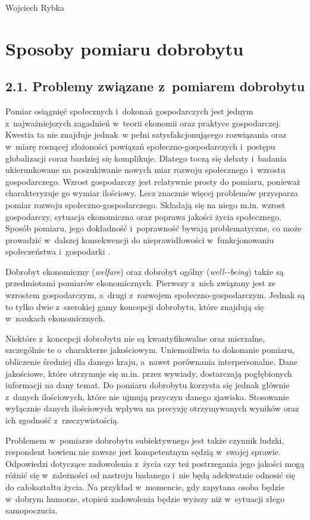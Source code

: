 \begin{artplenv}{Wojciech Rybka}
\section{Sposoby pomiaru dobrobytu}
\baselineskip
\subsection{2.1. Problemy związane z~pomiarem dobrobytu}
Pomiar osiągnięć społecznych i~dokonań gospodarczych jest jednym z~najważniejszych zagadnień w~teorii ekonomii oraz
praktyce gospodarczej. Kwestia ta nie znajduje jednak~w pełni satysfakcjonującego rozwiązania oraz w~miarę rosnącej
złożoności powiązań społeczno-gospodarczych i~postępu globalizacji coraz bardziej się komplikuje. Dlatego toczą się
debaty  i~badania ukierunkowane na poszukiwanie nowych miar rozwoju społecznego i~wzrostu gospodarczego. Wzrost
gospodarczy jest relatywnie prosty do pomiaru, ponieważ charakteryzuje go wymiar ilościowy. Lecz znacznie więcej
problemów przysparza pomiar rozwoju społeczno-gospodarczego. Składają się na niego m.in. wzrost gospodarczy, sytuacja
ekonomiczna oraz poprawa jakości życia społecznego. Sposób pomiaru, jego dokładność i~poprawność bywają problematyczne,
co może prowadzić w~dalszej konsekwencji do nieprawidłowości w~funkcjonowaniu społeczeństwa i~gospodarki
\parencite{cieslik_dylemat_2014}.

Dobrobyt ekonomiczny (\textit{welfare}) oraz dobrobyt ogólny (\textit{well-\mbox{-being}}) także są przedmiotami pomiarów
ekonomicznych. Pierwszy z~nich związany jest ze wzrostem gospodarczym, a~drugi z~rozwojem społeczno-gospodarczym.
Jednak są to tylko dwie z~szerokiej gamy koncepcji dobrobytu, które znajdują się w~naukach ekonomicznych.

Niektóre z~koncepcji dobrobytu nie są kwantyfikowalne oraz mierzalne, szczególnie te o~charakterze jakościowym.
Uniemożliwia to dokonanie pomiaru, obliczenie średniej dla danego kraju, a~nawet porównania interpersonalne. Dane
jakościowe, które otrzymuje się m.in. przez wywiady, dostarczają pogłębionych informacji na dany temat. Do pomiaru
dobrobytu korzysta się jednak głównie z~danych ilościowych, które nie ujmują przyczyn danego zjawiska. Stosowanie
wyłącznie danych ilościowych wpływa na precyzję otrzymywanych wyników oraz ich zgodność z~rzeczywistością.

Problemem w~pomiarze dobrobytu subiektywnego jest także czynnik ludzki, respondent bowiem nie zawsze jest kompetentnym
sędzią w~swojej sprawie. Odpowiedzi dotyczące zadowolenia z~życia czy też postrzegania
jego jakości mogą różnić się w~zależności
od nastroju badanego i~nie będą adekwatnie odnosić się do całokształtu życia. Na przykład w~momencie, gdy zapytana
osoba będzie w~dobrym humorze, stopień zadowolenia będzie wyższy niż w~sytuacji złego samopoczucia. 


\end{artplenv}
